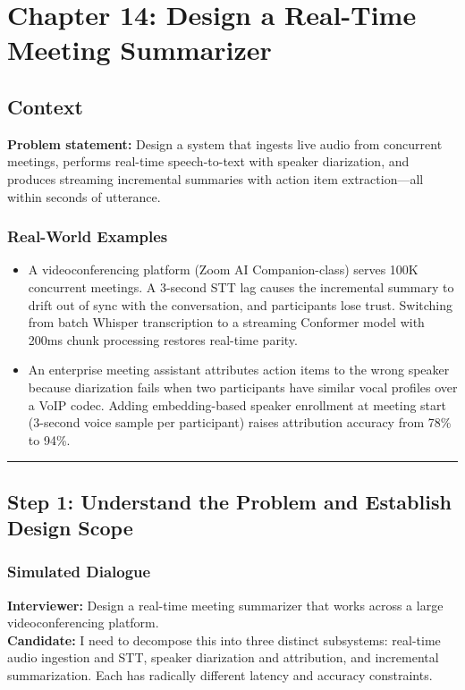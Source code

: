 \chapter{Chapter 14: Design a Real-Time Meeting Summarizer}

\section*{Context}

\textbf{Problem statement:} Design a system that ingests live audio from concurrent meetings, performs real-time speech-to-text with speaker diarization, and produces streaming incremental summaries with action item extraction---all within seconds of utterance.

\subsection*{Real-World Examples}

\begin{itemize}
  \item A videoconferencing platform (Zoom AI Companion-class) serves 100K concurrent meetings. A 3-second STT lag causes the incremental summary to drift out of sync with the conversation, and participants lose trust. Switching from batch Whisper transcription to a streaming Conformer model with 200ms chunk processing restores real-time parity.
  \item An enterprise meeting assistant attributes action items to the wrong speaker because diarization fails when two participants have similar vocal profiles over a VoIP codec. Adding embedding-based speaker enrollment at meeting start (3-second voice sample per participant) raises attribution accuracy from 78\% to 94\%.
\end{itemize}

\bigskip\hrule\bigskip

\section*{Step 1: Understand the Problem and Establish Design Scope}

\subsection*{Simulated Dialogue}

\textbf{Interviewer:} Design a real-time meeting summarizer that works across a large videoconferencing platform.\\
\textbf{Candidate:} I need to decompose this into three distinct subsystems: real-time audio ingestion and STT, speaker diarization and attribution, and incremental summarization. Each has radically different latency and accuracy constraints.

